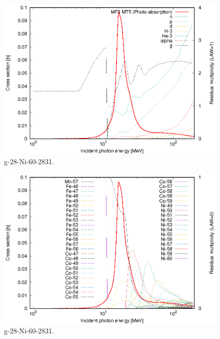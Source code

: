 \begin{figure}
 \includegraphics[width=\linewidth]{eps/g_28-Ni-60_2831.eps}
  \caption{g-28-Ni-60-2831.}
\end{figure}
\begin{figure}
 \includegraphics[width=\linewidth]{eps-law0/g_28-Ni-60_2831.eps}
 \caption{g-28-Ni-60-2831.}
\end{figure}
\newpage \clearpage

